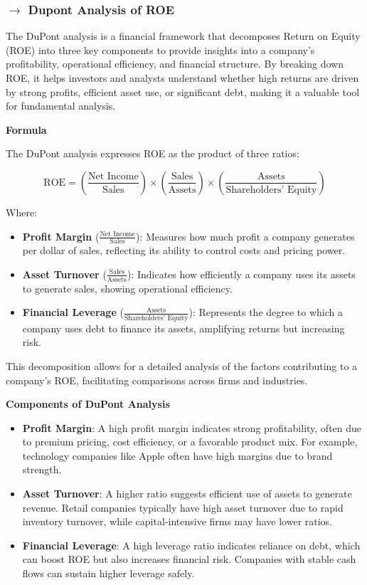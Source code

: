 \documentclass[12pt]{article}
\begin{document}
\subsubsection*{$\rightarrow$ Dupont Analysis of ROE}

The DuPont analysis is a financial framework that decomposes Return on Equity (ROE) into three key components to provide insights into a company's profitability, operational efficiency, and financial structure. By breaking down ROE, it helps investors and analysts understand whether high returns are driven by strong profits, efficient asset use, or significant debt, making it a valuable tool for fundamental analysis.

\textbf{Formula}

The DuPont analysis expresses ROE as the product of three ratios:

\[
\text{ROE} = \left( \frac{\text{Net Income}}{\text{Sales}} \right) \times \left( \frac{\text{Sales}}{\text{Assets}} \right) \times \left( \frac{\text{Assets}}{\text{Shareholders' Equity}} \right)
\]

Where:
\begin{itemize}
    \item \textbf{Profit Margin} (\(\frac{\text{Net Income}}{\text{Sales}}\)): Measures how much profit a company generates per dollar of sales, reflecting its ability to control costs and pricing power.
    \item \textbf{Asset Turnover} (\(\frac{\text{Sales}}{\text{Assets}}\)): Indicates how efficiently a company uses its assets to generate sales, showing operational efficiency.
    \item \textbf{Financial Leverage} (\(\frac{\text{Assets}}{\text{Shareholders' Equity}}\)): Represents the degree to which a company uses debt to finance its assets, amplifying returns but increasing risk.
\end{itemize}

This decomposition allows for a detailed analysis of the factors contributing to a company's ROE, facilitating comparisons across firms and industries.

\textbf{Components of DuPont Analysis}

\begin{itemize}
    \item \textbf{Profit Margin}: A high profit margin indicates strong profitability, often due to premium pricing, cost efficiency, or a favorable product mix. For example, technology companies like Apple often have high margins due to brand strength.
    \item \textbf{Asset Turnover}: A higher ratio suggests efficient use of assets to generate revenue. Retail companies typically have high asset turnover due to rapid inventory turnover, while capital-intensive firms may have lower ratios.
    \item \textbf{Financial Leverage}: A high leverage ratio indicates reliance on debt, which can boost ROE but also increases financial risk. Companies with stable cash flows can sustain higher leverage safely.
\end{itemize}
\end{document}

